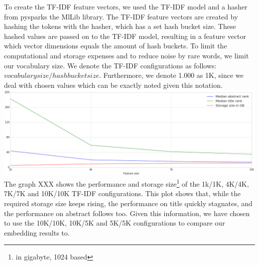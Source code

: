 \documentclass[../../Thesis.tex]{subfiles}
\begin{document}
To create the TF-IDF feature vectors, we used the TF-IDF model and a hasher from pysparks the MlLib library. The TF-IDF feature vectors are created by hashing the tokens with the hasher, which has a set hash bucket size. These hashed values are passed on to the TF-IDF model, resulting in a feature vector which vector dimensions equals the amount of hash buckets. To limit the computational and storage expenses and to reduce noise by rare words, we limit our vocabulary size.
We denote the TF-IDF configurations as follows: $vocabulary size/hashbucket size$. Furthermore, we denote 1.000 as 1K, since we deal with chosen values which can be exactly noted given this notation.\\
\includegraphics[width=6in]{Plots/tfidf_selection_plot}\\
The graph XXX shows the performance and storage size\footnote{in gigabyte, 1024 based} of the 1k/1K, 4K/4K, 7K/7K and 10K/10K TF-IDF configurations. This plot shows that, while the required storage size keeps rising, the performance on title quickly stagnates, and the performance on abstract follows too. Given this information, we have chosen to use the 10K/10K, 10K/5K and 5K/5K configurations to compare our embedding results to.
\end{document}
